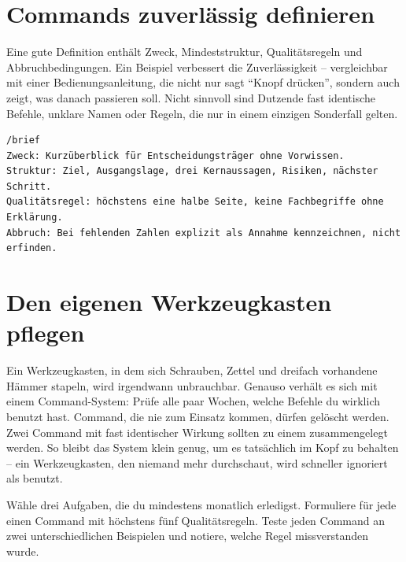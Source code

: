 \section{Commands zuverlässig definieren}

Eine gute Definition enthält Zweck, Mindeststruktur, Qualitätsregeln und Abbruchbedingungen. Ein Beispiel verbessert die Zuverlässigkeit -- vergleichbar mit einer Bedienungsanleitung, die nicht nur sagt ``Knopf drücken'', sondern auch zeigt, was danach passieren soll. Nicht sinnvoll sind Dutzende fast identische Befehle, unklare Namen oder Regeln, die nur in einem einzigen Sonderfall gelten.

\begin{lstlisting}
/brief
Zweck: Kurzüberblick für Entscheidungsträger ohne Vorwissen.
Struktur: Ziel, Ausgangslage, drei Kernaussagen, Risiken, nächster Schritt.
Qualitätsregel: höchstens eine halbe Seite, keine Fachbegriffe ohne Erklärung.
Abbruch: Bei fehlenden Zahlen explizit als Annahme kennzeichnen, nicht erfinden.
\end{lstlisting}

\section{Den eigenen Werkzeugkasten pflegen}

Ein Werkzeugkasten, in dem sich Schrauben, Zettel und dreifach vorhandene Hämmer stapeln, wird irgendwann unbrauchbar. Genauso verhält es sich mit einem Command-System: Prüfe alle paar Wochen, welche Befehle du wirklich benutzt hast. Command, die nie zum Einsatz kommen, dürfen gelöscht werden. Zwei Command mit fast identischer Wirkung sollten zu einem zusammengelegt werden. So bleibt das System klein genug, um es tatsächlich im Kopf zu behalten -- ein Werkzeugkasten, den niemand mehr durchschaut, wird schneller ignoriert als benutzt.

\begin{praxis}
Wähle drei Aufgaben, die du mindestens monatlich erledigst. Formuliere für jede einen Command mit höchstens fünf Qualitätsregeln. Teste jeden Command an zwei unterschiedlichen Beispielen und notiere, welche Regel missverstanden wurde.
\end{praxis}
